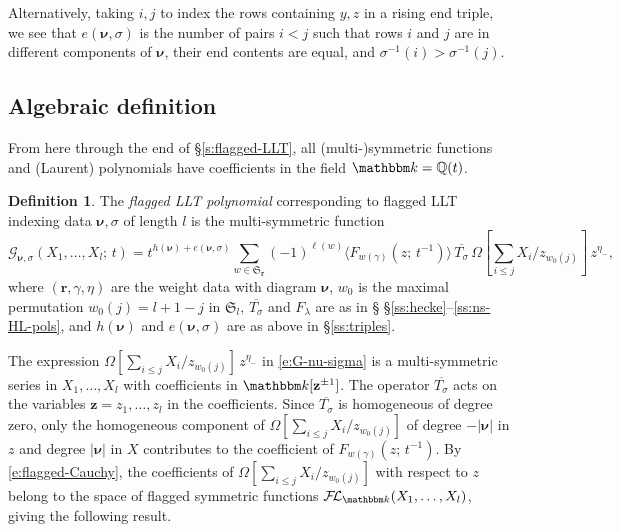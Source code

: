 \documentclass[12pt]{amsart}
\theoremstyle{definition}
\newtheorem{defn}[thm]{Definition}
\theoremstyle{remark}
\newcommand{\multisymmetric}{(multi\mbox{-})symmetric }
\newcommand{\QQ}{{\mathbb Q}}
\newcommand{\kk}{{\mathbbm k}}
\newcommand{\rr}{{\mathbf r}}
\newcommand{\zz}{{\mathbf z}}
\newcommand{\nubold}{{\boldsymbol \nu }}
\newcommand{\Sfrak}{{\mathfrak S}}
\newcommand{\Gcal}{{\mathcal G}}
\newcommand{\FLambda}{\mathcal{F\!L}}
\begin{document}
Alternatively, taking $i,j$ to index the rows containing $y,z$ in a
rising end triple, we see that $e(\nubold ,\sigma )$ is the number of
pairs $i<j$ such that rows $i$ and $j$ are in different components of
$\nubold $, their end contents are equal, and $\sigma ^{-1}(i)>\sigma
^{-1}(j)$.


\subsection{Algebraic definition}
\label{ss:G-nu-sigma}

From here through the end of \S \ref{s:flagged-LLT}, all
\multisymmetric functions and (Laurent) polynomials have
coefficients in the field $\kk =\QQ (t)$.

\begin{defn}\label{def:G-nu-sigma}
The {\em flagged LLT polynomial} corresponding to flagged LLT indexing
data $\nubold ,\sigma $ {of length $l$} is the multi-symmetric
function
\begin{equation}\label{e:G-nu-sigma}
\Gcal _{\nubold , \sigma}(X_{1},\ldots,X_{l};\, t) = t^{h(\nubold ) +
e(\nubold ,\sigma )} \sum _{w\in \Sfrak _{\rr }} (-1)^{\ell (w)}
\langle F_{w(\gamma )}(z;\, t^{-1}) \rangle\, \overline{T_{\sigma }}\,
\Omega [\sum _{i\leq j} X_{i} /z_{w_{0}(j)} ] \, z^{\eta _{-}},
\end{equation}
where $(\rr ,\gamma ,\eta )$ are the weight data with diagram $\nubold
$, $w_{0}$ is the maximal permutation $w_{0}(j) = l+1-j$ in
$\Sfrak_{l}$, $\overline{T_{\sigma }}$ and $F_{\lambda }$ are as in \S
\S \ref{ss:hecke}--\ref{ss:ns-HL-pols}, and $h(\nubold )$ and
$e(\nubold ,\sigma )$ are as above in \S \ref{ss:triples}.
\end{defn}

The expression $\Omega [\sum _{i\leq j} X_{i} /z_{w_{0}(j)} ] \,
z^{\eta _{-}}$ in \eqref{e:G-nu-sigma} is a multi-symmetric series in
$X_{1},\ldots,X_{l}$ with coefficients in $\kk [\zz ^{\pm 1}]$.  The
operator $\overline{T_{\sigma }}$ acts on the variables $\zz =
z_{1},\ldots,z_{l}$ in the coefficients.  Since $\overline{T_{\sigma
}}$ is homogeneous of degree zero, only the homogeneous component of
$\Omega [\sum _{i\leq j} X_{i} /z_{w_{0}(j)} ] $ of degree $-|\nubold
|$ in $z$ and degree $|\nubold |$ in $X$ contributes to the
coefficient of $F_{w(\gamma )}(z;\, t^{-1})$.  By
\eqref{e:flagged-Cauchy}, the coefficients of $\Omega [\sum _{i\leq j}
X_{i} /z_{w_{0}(j)} ] $ with respect to $z$ belong to the space of
flagged symmetric functions $\FLambda  _{\kk }(X_{1},\ldots,X_{l})$,
giving the following result.
\end{document}

